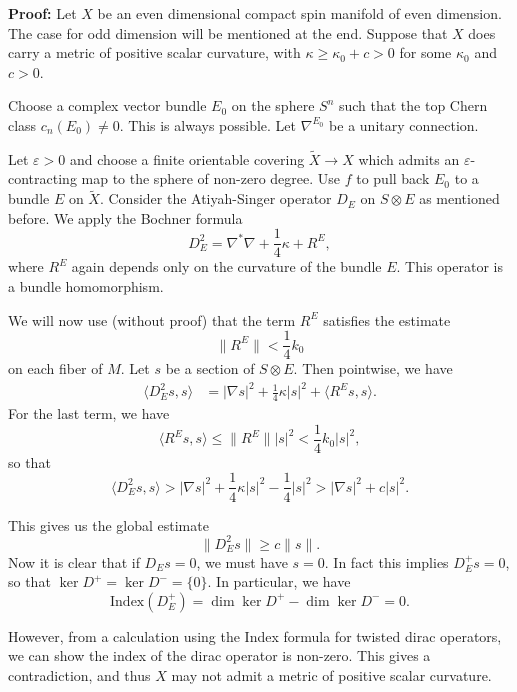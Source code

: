 \documentclass[11pt, reqno]{article}
\theoremstyle{plain}
\theoremstyle{definition}
\theoremstyle{remark}
\renewcommand{\epsilon}{\varepsilon}
\begin{document}
\textbf{Proof:} Let $X$ be an even dimensional compact spin manifold of even dimension. The 
case for odd dimension will be mentioned at the end. Suppose that $X$ does carry a metric 
of positive scalar curvature, with $\kappa \geq \kappa_0 + c > 0$ for some $\kappa_0$ and $c > 0$. 

Choose a complex vector bundle $E_0$ on the sphere $S^n$ such that the top Chern class $c_n(E_0) \neq 0$. 
This is always possible. Let $\nabla^{E_0}$ be a unitary connection.

Let $\epsilon > 0$ and choose a finite orientable covering $\tilde{X} \to X$ which admits 
an $\epsilon$-contracting map to the sphere of non-zero degree. Use $f$ to pull back $E_0$
to a bundle $E$ on $\tilde{X}$. Consider the Atiyah-Singer operator $D_E$ on $S\otimes E$ 
as mentioned before. We apply the Bochner formula
\[
    D_E^2 = \nabla^*\nabla + \frac{1}{4}\kappa + R^E,
\]
where $R^E$ again depends only on the curvature of the bundle $E$. This operator is a bundle homomorphism.

We will now use (without proof) that the term $R^E$ satisfies the estimate
\[
    \|R^E\| < \frac{1}{4}k_0
\]
on each fiber of $M$. Let $s$ be a section of $S\otimes E$. Then pointwise, we have
\begin{align}
    \langle D_E^2 s, s\rangle & = |\nabla s|^2 + \frac{1}{4}\kappa |s|^2 + \langle R^E s, s\rangle.
\end{align}
For the last term, we have
\[
    \langle R^E s, s \rangle \leq \|R^E\||s|^2 < \frac{1}{4}k_0 |s|^2,
\]
so that
\[
    \langle D_E^2 s, s\rangle > |\nabla s|^2 + \frac{1}{4}\kappa |s|^2 - \frac{1}{4}|s|^2 > |\nabla s|^2 + c|s|^2.
\]

This gives us the global estimate
\[
    \|D_E^2 s\| \geq c\|s\|.
\]
Now it is clear that if $D_E s = 0$, we must have $s = 0$. In fact this implies $D_E^+ s = 0$, so that 
$\ker D^+ = \ker D^- = \{0\}$. In particular, we have
\[
    \text{Index}(D_E^+) = \dim\ker D^+ - \dim\ker D^- = 0.
\]

However, from a calculation using the Index formula for twisted dirac operators, we can show the index of 
the dirac operator is non-zero. This gives a contradiction, and thus $X$ may not admit a metric 
of positive scalar curvature. 
\end{document}
